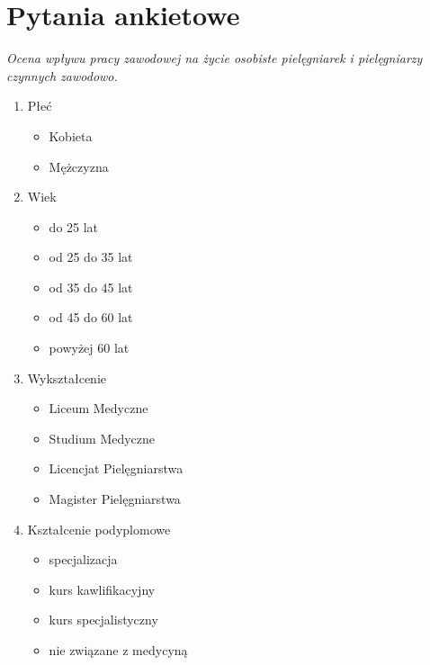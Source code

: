 \documentclass[a4paper,12pt,twoside,openright]{mwrep}
\begin{document}
\listoftables
\listoffigures




\chapter{Pytania ankietowe}
\label{app:ankieta}

\textit{Ocena wpływu pracy zawodowej na życie osobiste pielęgniarek i pielęgniarzy czynnych zawodowo.}

\begin{enumerate}[label=(\Roman*)]
	\item{Płeć}
		\begin{itemize}
			\item{Kobieta}
			\item{Mężczyzna}
		\end{itemize}
			\vspace{\baselineskip} 
	\item{Wiek}
		\begin{itemize}
			\item{do 25 lat}
			\item{od 25 do 35 lat}
			\item{od 35 do 45 lat}
			\item{od 45 do 60 lat}
			\item{powyżej 60 lat}
		\end{itemize}
			\vspace{\baselineskip} 
	\item{Wykształcenie}
		\begin{itemize}
			\item{Liceum Medyczne}
			\item{Studium Medyczne}
			\item{Licencjat Pielęgniarstwa}
			\item{Magister Pielęgniarstwa}
		\end{itemize}
			\vspace{\baselineskip} 
	\item{Kształcenie podyplomowe}
		\begin{itemize}
			\item{specjalizacja}
			\item{kurs kawlifikacyjny}
			\item{kurs specjalistyczny}
			\item{nie związane z medycyną}
		\end{itemize}

\end{enumerate}
\end{document}

